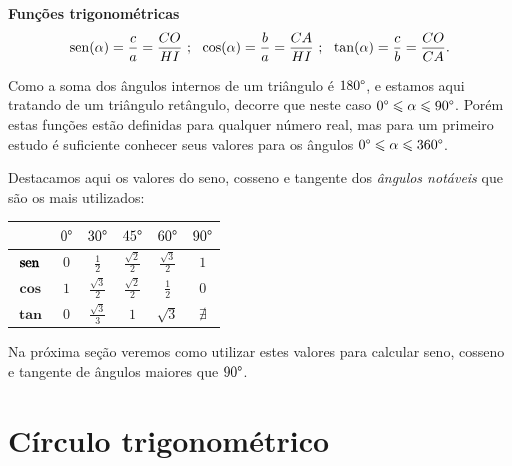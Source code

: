  \vskip0.3cm

\colorbox{azul}{
 \begin{minipage}{0.9\linewidth}
 \begin{center}
 \textbf{Funções trigonométricas}
  \begin{eqnarray*}
   \operatorname{sen}(\alpha)= \frac{c}{a}= \frac{CO}{HI} \ ; \ \
   \cos(\alpha)= \frac{b}{a}= \frac{CA}{HI} \ ; \ \
   \tan(\alpha)= \frac{c}{b}= \frac{CO}{CA}.
 \end{eqnarray*}
 \end{center}
 \end{minipage}}

 \vskip0.3cm

 Como a soma dos ângulos internos de um triângulo é $180 \degree$, e estamos aqui tratando de um triângulo retângulo, decorre que neste caso $0 \degree \leqslant \alpha \leqslant 90 \degree$. Porém estas funções estão definidas para qualquer número real, mas para um primeiro estudo é suficiente conhecer seus valores para os ângulos $0 \degree \leqslant \alpha \leqslant 360 \degree$.

 Destacamos aqui os valores do seno, cosseno e tangente dos \emph{ângulos notáveis} que são os mais utilizados:

 \begin{table}[H]
 \centering
 \begin{tabular}{|c|c|c|c|c|c|} \hline
 \rowcolor{cinza}
               & $0 \degree$  & $30 \degree$  & $45 \degree$  & $60 \degree$ & $90 \degree$  \\\hline
  $\pmb{\operatorname{sen}}$ & $0$ &$\frac{1}{2}$ & $\frac{\sqrt{2}}{2}$ & $\frac{\sqrt{3}}{2}$ & $1$ \\\hline
  $\pmb{\cos}$ & $1$ & $\frac{\sqrt{3}}{2}$ & $\frac{\sqrt{2}}{2}$ & $\frac{1}{2}$ & $0$ \\\hline
  $\pmb{\tan}$ & $0$ & $\frac{\sqrt{3}}{3}$ & $1$ & $\sqrt{3}$ & $\nexists$ \\\hline
 \end{tabular}
\end{table}
 Na próxima seção veremos como utilizar estes valores para calcular seno, cosseno e tangente de ângulos maiores que $90 \degree$.

\section{Círculo trigonométrico}


